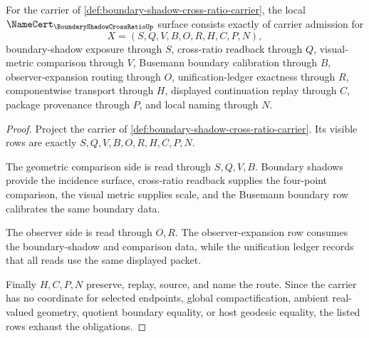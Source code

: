 \begin{theorem}
\label{thm:boundary-shadow-cross-ratio-namecert-obligations}
For the carrier of \autoref{def:boundary-shadow-cross-ratio-carrier}, the local $\NameCert_{\BoundaryShadowCrossRatioUp}$ surface consists exactly of carrier admission for
$$
X=(S,Q,V,B,O,R,H,C,P,N),
$$
boundary-shadow exposure through $S$, cross-ratio readback through $Q$, visual-metric comparison through $V$, Busemann boundary calibration through $B$, observer-expansion routing through $O$, unification-ledger exactness through $R$, componentwise transport through $H$, displayed continuation replay through $C$, package provenance through $P$, and local naming through $N$.
\end{theorem}
\begin{proof}
Project the carrier of \autoref{def:boundary-shadow-cross-ratio-carrier}. Its visible rows are exactly $S,Q,V,B,O,R,H,C,P,N$.

The geometric comparison side is read through $S,Q,V,B$. Boundary shadows provide the incidence surface, cross-ratio readback supplies the four-point comparison, the visual metric supplies scale, and the Busemann boundary row calibrates the same boundary data.

The observer side is read through $O,R$. The observer-expansion row consumes the boundary-shadow and comparison data, while the unification ledger records that all reads use the same displayed packet.

Finally $H,C,P,N$ preserve, replay, source, and name the route. Since the carrier has no coordinate for selected endpoints, global compactification, ambient real-valued geometry, quotient boundary equality, or host geodesic equality, the listed rows exhaust the obligations.
\end{proof}

